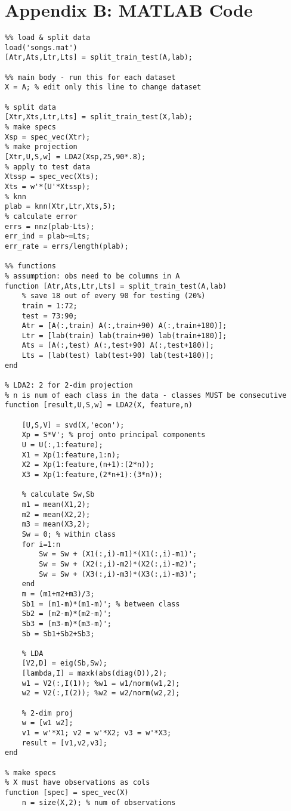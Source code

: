 \documentclass[a4paper,10 pt]{article}
\begin{document}
\section{Appendix B: MATLAB Code}
\begin{lstlisting}
%% load & split data
load('songs.mat')
[Atr,Ats,Ltr,Lts] = split_train_test(A,lab);

%% main body - run this for each dataset
X = A; % edit only this line to change dataset

% split data
[Xtr,Xts,Ltr,Lts] = split_train_test(X,lab);
% make specs
Xsp = spec_vec(Xtr);
% make projection
[Xtr,U,S,w] = LDA2(Xsp,25,90*.8);
% apply to test data
Xtssp = spec_vec(Xts);
Xts = w'*(U'*Xtssp);
% knn
plab = knn(Xtr,Ltr,Xts,5);
% calculate error
errs = nnz(plab-Lts);
err_ind = plab~=Lts;
err_rate = errs/length(plab);

%% functions
% assumption: obs need to be columns in A
function [Atr,Ats,Ltr,Lts] = split_train_test(A,lab)
    % save 18 out of every 90 for testing (20%)
    train = 1:72;
    test = 73:90;
    Atr = [A(:,train) A(:,train+90) A(:,train+180)];
    Ltr = [lab(train) lab(train+90) lab(train+180)];
    Ats = [A(:,test) A(:,test+90) A(:,test+180)];
    Lts = [lab(test) lab(test+90) lab(test+180)];
end

% LDA2: 2 for 2-dim projection
% n is num of each class in the data - classes MUST be consecutive
function [result,U,S,w] = LDA2(X, feature,n)
    
    [U,S,V] = svd(X,'econ');
    Xp = S*V'; % proj onto principal components
    U = U(:,1:feature);
    X1 = Xp(1:feature,1:n);
    X2 = Xp(1:feature,(n+1):(2*n));
    X3 = Xp(1:feature,(2*n+1):(3*n));
    
    % calculate Sw,Sb
    m1 = mean(X1,2);
    m2 = mean(X2,2);
    m3 = mean(X3,2);
    Sw = 0; % within class
    for i=1:n
        Sw = Sw + (X1(:,i)-m1)*(X1(:,i)-m1)';
        Sw = Sw + (X2(:,i)-m2)*(X2(:,i)-m2)';
        Sw = Sw + (X3(:,i)-m3)*(X3(:,i)-m3)';
    end
    m = (m1+m2+m3)/3;
    Sb1 = (m1-m)*(m1-m)'; % between class
    Sb2 = (m2-m)*(m2-m)';
    Sb3 = (m3-m)*(m3-m)';
    Sb = Sb1+Sb2+Sb3;
    
    % LDA
    [V2,D] = eig(Sb,Sw);
    [lambda,I] = maxk(abs(diag(D)),2);
    w1 = V2(:,I(1)); %w1 = w1/norm(w1,2);
    w2 = V2(:,I(2)); %w2 = w2/norm(w2,2);
    
    % 2-dim proj
    w = [w1 w2];
    v1 = w'*X1; v2 = w'*X2; v3 = w'*X3;
    result = [v1,v2,v3];
end

% make specs
% X must have observations as cols
function [spec] = spec_vec(X)
    n = size(X,2); % num of observations


\end{lstlisting}
\end{document}
